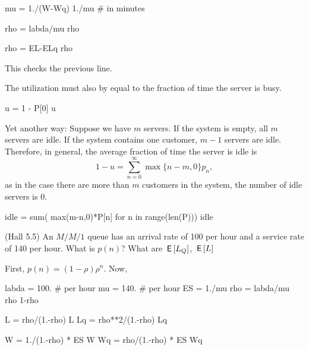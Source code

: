 \begin{exercise}
\begin{solution}
\begin{pyconsole}
mu = 1./(W-Wq)
1./mu # in minutes

rho = labda/mu
rho
\end{pyconsole}

\begin{pyconsole}
rho = EL-ELq
rho
\end{pyconsole}
This checks the previous line.

The utilization must also by equal to the fraction of time the server is busy. 
\begin{pyconsole}
u = 1 - P[0]
u
\end{pyconsole}

Yet another way: Suppose we have $m$ servers. If the system is empty,
all $m$ servers are idle. If the system contains one customer, $m-1$
servers are idle. Therefore, in general, the average fraction of time
the server is idle is
\begin{equation*}
1- u = \sum_{n=0}^\infty \max\{n-m, 0\}  p_n,
\end{equation*}
as in the case there are more than $m$ customers in the system, the
number of idle servers is $0$.


\begin{pyconsole}
idle = sum( max(m-n,0)*P[n] for n in range(len(P)))
idle
\end{pyconsole}

   \end{solution}
 
\end{exercise}

\begin{exercise}
  (Hall 5.5) An $M/M/1$ queue has an arrival rate of 100 per hour and
  a service rate of 140 per hour.
 What is $p(n)$?  What are $\,\mathsf{E}\left[L_Q\right]$, $\,\mathsf{E}\left[L\right]$ 
\begin{solution}
First, $p(n) = (1-\rho)\rho^n$. Now,

\begin{pyconsole}
labda = 100. # per hour
mu = 140. # per hour
ES = 1./mu
rho = labda/mu
rho 
1-rho

L = rho/(1.-rho)
L
Lq = rho**2/(1.-rho)
Lq

W = 1./(1.-rho) * ES
W
Wq = rho/(1.-rho) * ES
Wq
\end{pyconsole}

  \end{solution}
\end{exercise}

